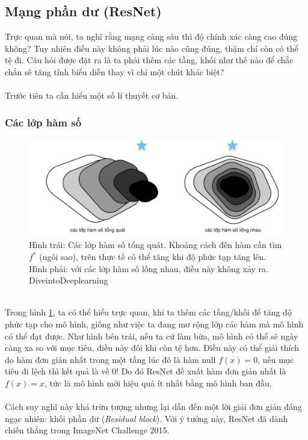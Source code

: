 \documentclass{article}
\begin{document}
\subsection{Mạng phần dư (ResNet)}
Trực quan mà nói, ta nghĩ rằng mạng càng sâu thì độ chính xác càng cao đúng không? Tuy nhiên điều này không phải lúc nào cũng đúng, thậm chí còn có thể tệ đi. Câu hỏi được đặt ra là ta phải thêm các tầng, khối như thế nào để chắc chắn sẽ tăng tính biểu diễn thay vì chỉ một chút khác biệt?\\\\
Trước tiên ta cần hiểu một số lí thuyết cơ bản.
\subsubsection{Các lớp hàm số}
\begin{figure}
    \centering
    \includegraphics[width = 0.7\linewidth]{functionclasses.pdf}
    \caption{Hình trái: Các lớp hàm số tổng quát. Khoảng cách đến hàm cần tìm  $f^{*}$ (ngôi sao), trên thực tế có thể tăng khi độ phức tạp tăng lên. Hình phải: với các lớp hàm số lồng nhau, điều này không xảy ra. DiveintoDeeplearning}
    \label{fig14}
\end{figure}
\phantom{a}\\
Trong hình \ref{fig14}, ta có thể hiểu trực quan, khi ta thêm các tầng/khối để tăng độ phức tạp cho mô hình, giống như việc ta đang mơ rộng lớp các hàm mà mô hình có thể đạt được. Như hình bên trái, nếu ta cứ làm bừa, mô hình có thể sẽ ngày càng xa so với mục tiêu, điều này đôi khi còn tệ hơn. Điều này có thể giải thích do hàm đơn giản nhất trong một tầng lúc đó là hàm null $f(x) = 0$, nếu mục tiêu đi lệch thì kết quả là về 0! Do đó ResNet đề xuất hàm đơn giản nhất là $f(x) = x$, tức là mô hình mới hiệu quả ít nhất bằng mô hình ban đầu.\\\\
Cách suy nghĩ này khá trừu tượng nhưng lại dẫn đến một lời giải đơn giản đáng ngạc nhiên: khối phần dư (\textit{Residual block}). Với ý tưởng này, ResNet đã dành chiến thẳng trong ImageNet Challenge 2015. 
\end{document}
